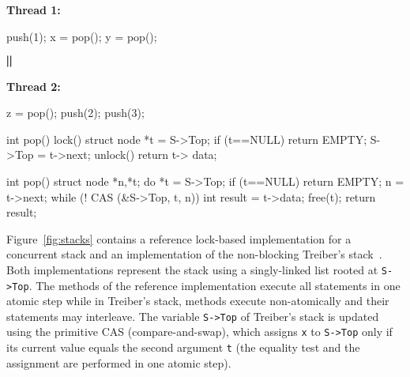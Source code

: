 \begin{figure*}[t]
\begin{minipage}{5cm}
\begin{minipage}{1.8cm}
\bigskip
{\bf Thread 1:}
\vspace{-1mm}
\begin{program}
push(1);
x = pop();
y = pop();
\end{program}
\end{minipage}
\begin{minipage}{.5cm}
\vspace{6mm}
{\large $\bigparallel$}
\end{minipage}
\begin{minipage}{2cm}
\bigskip
{\bf Thread 2:}
\vspace{-1mm}
\begin{program}
z = pop();
push(2);
push(3);
\end{program}
\end{minipage}
\end{minipage}
\begin{minipage}{6.5cm}
\lstset{firstnumber=10}
\begin{program}
int pop() {
	lock()
	struct node *t = S->Top;
	if (t==NULL)
		return EMPTY;
	S->Top = t->next;
	unlock()
	return t-> data;
}
\end{program}
\end{minipage}
\begin{minipage}{6cm}
\lstset{firstnumber=10}
\begin{program}
int pop() {
	struct node *n,*t;
	do {
		*t = S->Top;
		if (t==NULL)
			return EMPTY;
		n = t->next;
	} while (! CAS (&S->Top, t, n))
	int result = t->data;
	free(t);
	return result;
}

\end{program}
\end{minipage}
\caption{A reference lock-based implementation of a concurrent stack and Treiber's stack implementation ({\tt EMPTY} is a special value denoting the empty stack). The client program $P$ consists of two concurrent threads executing the statements in the left and respectively, the right of the $\parallel$ symbol.}
\label{fig:stacks}
\end{figure*}

Figure~\ref{fig:stacks} contains a reference lock-based implementation for a concurrent stack and an implementation of the non-blocking Treiber's stack~\cite{Treiber'86}. Both implementations represent the stack using a singly-linked list rooted at {\tt S->Top}. The methods of the reference implementation execute all statements in one atomic step while in Treiber's stack, methods execute non-atomically and their statements may interleave. The variable {\tt S->Top} of Treiber's stack is updated using the primitive CAS (compare-and-swap), which assigns {\tt x} to {\tt S->Top} only if its current value equals the second argument {\tt t} (the equality test and the assignment are performed in one atomic step).

